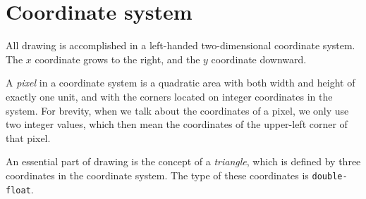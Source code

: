 \chapter{Coordinate system}

All drawing is accomplished in a left-handed two-dimensional
coordinate system.  The $x$ coordinate grows to the right, and the $y$
coordinate downward.

A \emph{pixel} in a coordinate system is a quadratic area with both
width and height of exactly one unit, and with the corners located on
integer coordinates in the system.  For brevity, when we talk about
the coordinates of a pixel, we only use two integer values, which then
mean the coordinates of the upper-left corner of that pixel.

An essential part of drawing is the concept of a \emph{triangle},
which is defined by three coordinates in the coordinate system.  The
type of these coordinates is \texttt{double-float}.
